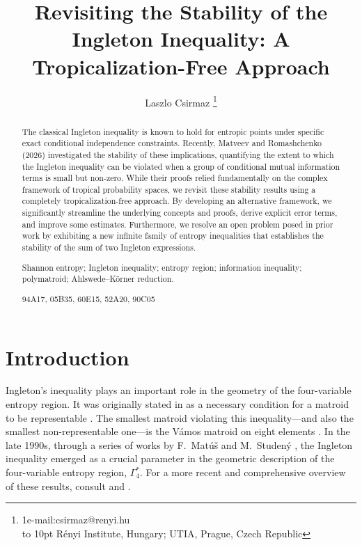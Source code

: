 \documentclass[a4paper]{IEEEtran}
\title{\bfseries\fontsize{17.4}{19}\selectfont
Revisiting the Stability of the Ingleton Inequality: A Tropicalization-Free Approach
}
\author{\fontsize{12.4}{12}\selectfont
Laszlo Csirmaz\IEEEauthorrefmark1
\thanks{\IEEEauthorrefmark1e-mail:csirmaz@renyi.hu\\
\hbox to 10pt{\hfil} R\'enyi Institute, Hungary; UTIA, Prague, Czech Republic}}
\def\Ga#1{\Gamma^*_{\!#1}}
\theoremstyle{definition}
\newenvironment{Keywords}[1]{\xdef\IEEEkeywordsname{#1}\IEEEkeywords}{\endIEEEkeywords}
\begin{document}
\maketitle

\begin{abstract}

\noindent
The classical Ingleton inequality is known to hold for entropic points under
specific exact conditional independence constraints. Recently, Matveev and
Romashchenko (2026) investigated the stability of these implications,
quantifying the extent to which the Ingleton inequality can be violated when
a group of conditional mutual information terms is small but non-zero. While
their proofs relied fundamentally on the complex framework of tropical
probability spaces, we revisit these stability results using a completely
tropicalization-free approach. By developing an alternative framework, we
significantly streamline the underlying concepts and proofs, derive explicit
error terms, and improve some estimates. Furthermore, we resolve an open
problem posed in prior work by exhibiting a new infinite family of entropy
inequalities that establishes the stability of the sum of two Ingleton
expressions.

\begin{Keywords}{Keywords}
Shannon entropy; Ingleton inequality; entropy region; 
information inequality; polymatroid; Ahlswede--K\"orner reduction.
\end{Keywords}

\begin{Keywords}{MSC classes}
94A17, 05B35, 60E15, 52A20, 90C05
\end{Keywords}
\end{abstract}


\section{Introduction}\label{sec:intro}

Ingleton's inequality plays an important role in the geometry of the
four-variable entropy region. It was originally stated in \cite{ingleton} as a
necessary condition for a matroid to be representable \cite{oxley}. The
smallest matroid violating this inequality---and also the smallest
non-representable one---is the V\'amos matroid on eight elements
\cite{oxley}. In the late 1990s, through a series of works by F.~Mat\'u\v{s} and
M.~Studen\'y \cite{Ma.Stud, mat95, mat99}, the Ingleton inequality emerged as a
crucial parameter in the geometric description of the four-variable entropy
region, $\Ga4$. For a more recent and comprehensive overview of these results,
consult \cite{MP20} and \cite{studeny21}. 
\end{document}
